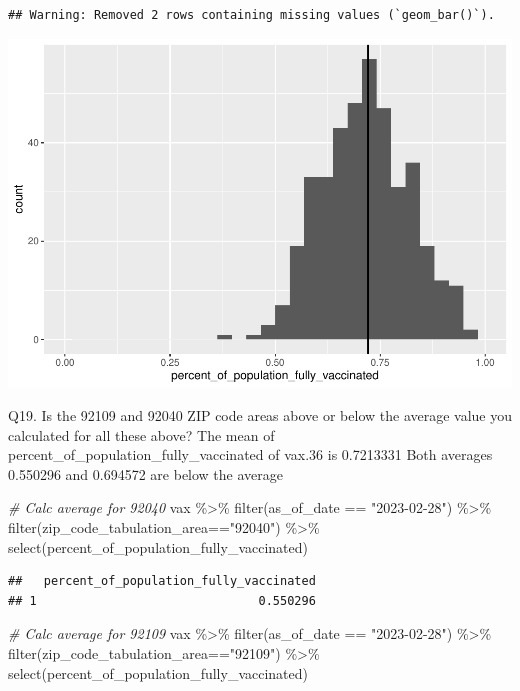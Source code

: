 \documentclass[
]{article}
\newenvironment{Shaded}{\begin{snugshade}}{\end{snugshade}}
\newcommand{\CommentTok}[1]{\textcolor[rgb]{0.56,0.35,0.01}{\textit{#1}}}
\newcommand{\FunctionTok}[1]{\textcolor[rgb]{0.00,0.00,0.00}{#1}}
\newcommand{\NormalTok}[1]{#1}
\newcommand{\SpecialCharTok}[1]{\textcolor[rgb]{0.00,0.00,0.00}{#1}}
\newcommand{\StringTok}[1]{\textcolor[rgb]{0.31,0.60,0.02}{#1}}
\begin{document}
\begin{verbatim}
## Warning: Removed 2 rows containing missing values (`geom_bar()`).
\end{verbatim}

\includegraphics{Lab-17-MiniAssn_files/figure-latex/unnamed-chunk-30-1.pdf}

Q19. Is the 92109 and 92040 ZIP code areas above or below the average
value you calculated for all these above? The mean of
percent\_of\_population\_fully\_vaccinated of vax.36 is 0.7213331 Both
averages 0.550296 and 0.694572 are below the average

\begin{Shaded}
\begin{Highlighting}[]
\CommentTok{\# Calc average for 92040}
\NormalTok{vax }\SpecialCharTok{\%\textgreater{}\%} \FunctionTok{filter}\NormalTok{(as\_of\_date }\SpecialCharTok{==} \StringTok{"2023{-}02{-}28"}\NormalTok{) }\SpecialCharTok{\%\textgreater{}\%}  
  \FunctionTok{filter}\NormalTok{(zip\_code\_tabulation\_area}\SpecialCharTok{==}\StringTok{"92040"}\NormalTok{) }\SpecialCharTok{\%\textgreater{}\%}
  \FunctionTok{select}\NormalTok{(percent\_of\_population\_fully\_vaccinated)}
\end{Highlighting}
\end{Shaded}

\begin{verbatim}
##   percent_of_population_fully_vaccinated
## 1                               0.550296
\end{verbatim}

\begin{Shaded}
\begin{Highlighting}[]
\CommentTok{\# Calc average for 92109}
\NormalTok{vax }\SpecialCharTok{\%\textgreater{}\%} \FunctionTok{filter}\NormalTok{(as\_of\_date }\SpecialCharTok{==} \StringTok{"2023{-}02{-}28"}\NormalTok{) }\SpecialCharTok{\%\textgreater{}\%}  
  \FunctionTok{filter}\NormalTok{(zip\_code\_tabulation\_area}\SpecialCharTok{==}\StringTok{"92109"}\NormalTok{) }\SpecialCharTok{\%\textgreater{}\%}
  \FunctionTok{select}\NormalTok{(percent\_of\_population\_fully\_vaccinated)}
\end{Highlighting}
\end{Shaded}
\end{document}
